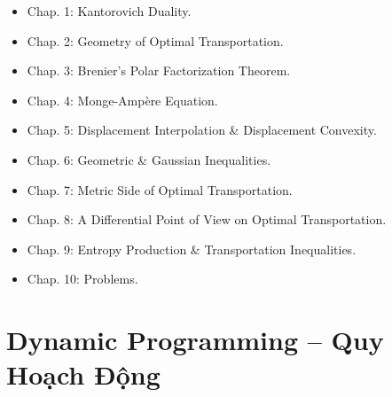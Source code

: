\documentclass{article}
\begin{document}
\begin{enumerate}
\begin{itemize}
		\item {\sf Chap. 1: Kantorovich Duality.}
		\item {\sf Chap. 2: Geometry of Optimal Transportation.}
		\item {\sf Chap. 3: Brenier's Polar Factorization Theorem.}
		\item {\sf Chap. 4: Monge-Amp\`ere Equation.}
		\item {\sf Chap. 5: Displacement Interpolation \& Displacement Convexity.}
		\item {\sf Chap. 6: Geometric \& Gaussian Inequalities.}
		\item {\sf Chap. 7: Metric Side of Optimal Transportation.}
		\item {\sf Chap. 8: A Differential Point of View on Optimal Transportation.}
		\item {\sf Chap. 9: Entropy Production \& Transportation Inequalities.}
		\item {\sf Chap. 10: Problems.}
	\end{itemize}
\end{enumerate}


\section{Dynamic Programming -- Quy Hoạch Động}



\end{document}
